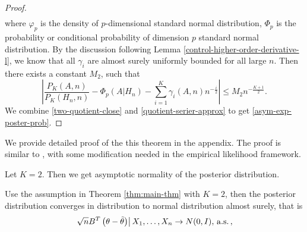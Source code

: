 \begin{thm}
\begin{proof}
\begin{eqnarray*}
\end{eqnarray*}
where $\varphi_{p}$ is the density of  $p$-dimensional standard normal
distribution, $\Phi_{p}$ is the probability or conditional probability
of dimension $p$ standard normal distribution. By the discussion
following Lemma \ref{control-higher-order-derivative-l}, we know that
all $\gamma_{i}$ are almost surely uniformly bounded for all large
$n$. Then there exists a constant $M_{2}$, such that 
\begin{equation}
\left|\frac{P_{K}\left(A,n\right)}{P_{K}\left(H_{n},n\right)}-\Phi_{p}\left(A|H_{n}\right)-\sum_{i=1}^{K}\gamma_{i}\left(A,n\right)n^{-\frac{i}{2}}\right|\le M_{2}n^{-\frac{K+1}{2}}.\label{eq:quotient-serier-approx}
\end{equation}
We combine \ref{two-quotient-close} and \ref{quotient-serier-approx}
to get \eqref{asym-exp-poster-prob}.
\end{proof}
\end{thm}
We provide detailed proof of the this theorem in the appendix. The proof
is similar to \citet{johnson1970asymptotic}, with some modification
needed in the empirical likelihood framework. 

Let $K=2$. Then we get asymptotic normality of the posterior distribution. 
\begin{cor}
Use the assumption in Theorem \ref{thm:main-thm} with $K=2$, then
the posterior distribution converges in distribution to normal distribution
almost surely, that is 
\[
\left.\sqrt{n}B^T\left(\theta-\tilde{\theta}\right)\right|X_{1},\ldots,X_{n}\rightarrow N(0,I),\,\mathrm{a.s.}\,,
\]
\end{cor}


